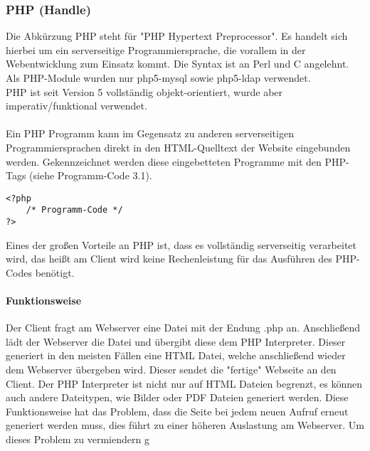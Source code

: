\subsubsection{PHP (Handle)}
Die Abkürzung PHP steht für "PHP Hypertext Preprocessor". Es handelt sich hierbei um ein serverseitige Programmiersprache, die vorallem in der Webentwicklung zum Einsatz kommt. Die Syntax ist an Perl und C angelehnt.\\
Als PHP-Module wurden nur php5-mysql sowie php5-ldap verwendet.\\
PHP ist seit Version 5 vollständig objekt-orientiert, wurde aber imperativ/funktional verwendet.\\
\\
Ein PHP Programm kann im Gegensatz zu anderen serverseitigen Programmiersprachen direkt in den HTML-Quelltext der Website eingebunden werden. Gekennzeichnet werden diese eingebetteten Programme mit den PHP-Tags (siehe Programm-Code 3.1).\\
\begin{lstlisting}[style=customPHP, caption={PHP-Tags}]
<?php 
	/* Programm-Code */
?>
\end{lstlisting}
Eines der großen Vorteile an PHP ist, dass es vollständig serverseitig verarbeitet wird, das heißt am Client wird keine Rechenleistung für das Ausführen des PHP-Codes benötigt.
\paragraph{Funktionsweise}
Der Client fragt am Webserver eine Datei mit der Endung .php an. Anschließend lädt der Webserver die Datei und übergibt diese dem PHP Interpreter. Dieser generiert in den meisten Fällen eine HTML Datei, welche anschließend wieder dem Webserver übergeben wird. Dieser sendet die "fertige" Webseite an den Client. Der PHP Interpreter ist nicht nur auf HTML Dateien begrenzt, es können auch andere Dateitypen, wie Bilder oder PDF Dateien generiert werden. Diese Funktionsweise hat das Problem, dass die Seite bei jedem neuen Aufruf erneut generiert werden muss, dies führt zu einer höheren Auslastung am Webserver. Um dieses Problem zu vermiendern g
